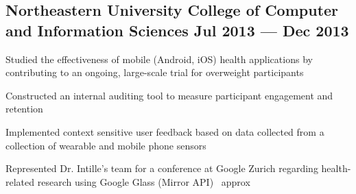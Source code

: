 

\subsection{{Northeastern University College of Computer and Information Sciences \hfill Jul 2013 --- Dec 2013}}
\begin{zitemize}
\item Studied the effectiveness of mobile (Android, iOS) health applications by contributing to an ongoing, large-scale trial for overweight participants
\item Constructed an internal auditing tool to measure participant engagement and retention
\item Implemented context sensitive user feedback based on data collected from a collection of wearable and mobile phone sensors
\item Represented Dr. Intille's team for a conference at Google Zurich regarding health-related research using Google Glass (Mirror API)
\ approx\end{zitemize}
